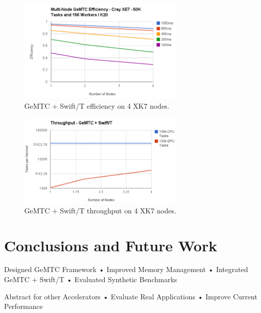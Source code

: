 \documentclass[conference]{IEEEtran}
\begin{document}
\begin{figure}[h]
\centering\includegraphics[width=8cm]{imgs/multinode.png}
\caption{GeMTC + Swift/T efficiency on 4 XK7 nodes.}
\label{fig:multinode}
\end{figure}

\begin{figure}[h]
\centering\includegraphics[width=8cm]{imgs/throughput4nodes.png}
\caption{GeMTC + Swift/T throughput on 4 XK7 nodes.}
\label{fig:throughput}
\end{figure}

\section{Conclusions and Future Work}
Designed GeMTC Framework
• Improved Memory Management
• Integrated GeMTC + Swift/T
• Evaluated Synthetic Benchmarks

Abstract for other Accelerators
• Evaluate Real Applications
• Improve Current Performance
\end{document}
